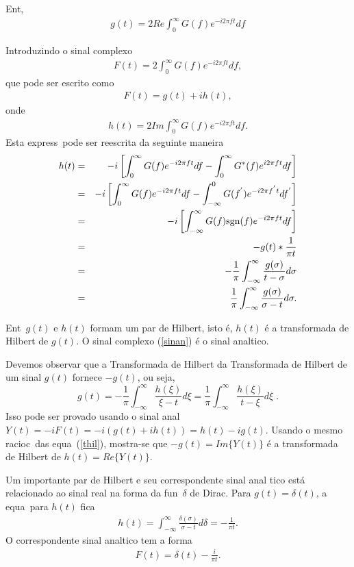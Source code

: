 Ent\ao,
\begin{eqnarray}
g(t) = 2Re\int_{0}^{\infty}G(f)e^{-i2\pi ft}df
\end{eqnarray}

Introduzindo o sinal complexo
\begin{eqnarray}
F(t) = 2\int_{0}^{\infty}G(f)e^{-i2\pi ft}df,
\end{eqnarray}
que pode ser escrito como
\begin{eqnarray}
F(t) = g(t) + ih(t),
\label{sinan}
\end{eqnarray}
onde
\begin{eqnarray}
h(t) = 2Im\int_{0}^{\infty}G(f)e^{-i2\pi ft}df.
\end{eqnarray}
Esta express\ao\ pode ser reescrita da seguinte maneira
\begin{eqnarray}
h(t) &=& -i\left[\int_{0}^{\infty}G(f)e^{-i2\pi ft}df -
\int_{0}^{\infty}G^{*}(f)e^{i2\pi ft}df  \right]\nonumber \\
&=& -i\left[\int_{0}^{\infty}G(f)e^{-i2\pi ft}df -
\int_{-\infty}^{0}G(f^{'})e^{-i2\pi f^{'}t}df^{'}  \right]\nonumber \\
&=& -i\left[\int_{-\infty}^{\infty}G(f)\mbox{sgn}(f)e^{-i2\pi ft}df
\right]\nonumber \\
&=& -g(t) * \frac{1}{\pi t}\nonumber \\
&=&
-\frac{1}{\pi}\int_{-\infty}^{\infty}\frac{g(\sigma)}{t-\sigma}d\sigma
\nonumber \\
&=& \frac{1}{\pi}\int_{-\infty}^{\infty}\frac{g(\sigma)}{\sigma -
t}d\sigma.
\label{thil}
\end{eqnarray}

Ent\ao\ $g(t)$ e $h(t)$ formam um par de Hilbert, isto \'e, $h(t)$ \'e
a transformada de Hilbert de $g(t)$. O sinal complexo (\ref{sinan})
\'e o sinal anal\ih tico.

Devemos observar que a Transformada de Hilbert da Transformada de
Hilbert de um sinal $g(t)$ fornece $-g(t)$, ou seja,
\begin{equation}
g(t) = - \frac{1}{\pi} \int_{-\infty}^{\infty} \frac{h(\xi)}{\xi-t}d\xi
= \frac{1}{\pi} \int_{-\infty}^{\infty} \frac{h(\xi)}{t-\xi}d\xi \; .
\label{thth}
\end{equation}
Isso pode ser provado usando o sinal anal\itico\ $Y(t) = -iF(t) = -i
(g(t) + ih(t)) = h(t) - i g(t)$. Usando o mesmo racioc\inio\ das equa\coes\
(\ref{thil}), mostra-se que $-g(t)=Im \{Y(t)\}$ \'e a transformada de
Hilbert de $h(t)=Re\{Y(t)\}$.

Um importante par de Hilbert e seu correspondente sinal anal\ih
tico est\'a relacionado ao sinal real na forma da fun\cao\
$\delta$ de Dirac. Para $g(t) = \delta(t)$, a equa\cao\ para
$h(t)$ fica
\begin{eqnarray}
h(t) = \int_{-\infty}^{\infty}\frac{\delta(\sigma)}{\sigma - t}d\delta
= -\frac{1}{\pi t}.
\end{eqnarray}
O correspondente sinal anal\ih tico tem a forma
\begin{eqnarray}
F(t) = \delta(t) - \frac{i}{\pi t}.
\end{eqnarray}

